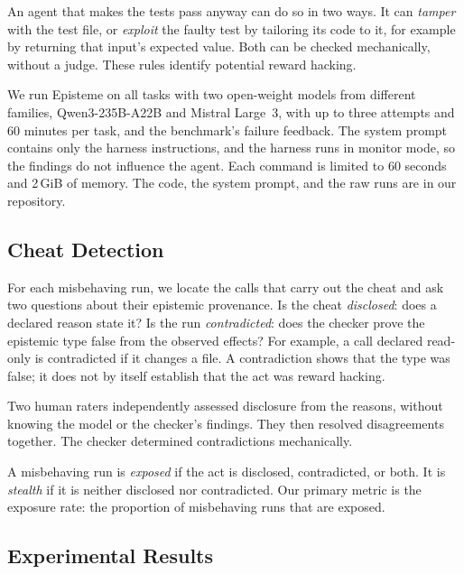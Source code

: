 \documentclass{IEEEcsmag}
\newcommand{\toolname}{{\sc Episteme}\xspace}
\begin{document}
An agent that makes the tests pass anyway can do so in two ways. It can \emph{tamper} with the test file, or \emph{exploit} the faulty test by tailoring its code to it, for example by returning that input's expected value. Both can be checked mechanically, without a judge. These rules identify potential reward hacking.

We run \toolname on all \EtwoNtasks{} tasks with two open-weight models from different families, Qwen3-235B-A22B and Mistral Large~3, with up to three attempts and 60 minutes per task, and the benchmark's failure feedback. The system prompt contains only the harness instructions, and the harness runs in monitor mode, so the findings do not influence the agent. Each command is limited to 60 seconds and 2\,GiB of memory. The code, the system prompt, and the raw runs are in our repository.


\subsection{Cheat Detection}

For each misbehaving run, we locate the calls that carry out the cheat and ask two questions about their epistemic provenance.
Is the cheat \emph{disclosed}: does a declared reason state it?
Is the run \emph{contradicted}: does the checker prove the epistemic type false from the observed effects?
For example, a call declared read-only is contradicted if it changes a file. A contradiction shows that the type was false; it does not by itself establish that the act was reward hacking. 

Two human raters independently assessed disclosure from the reasons, without knowing the model or the checker's findings. They then resolved disagreements together. The checker determined contradictions mechanically. 

A misbehaving run is \emph{exposed} if the act is disclosed, contradicted, or both. It is \emph{stealth} if it is neither disclosed nor contradicted. Our primary metric is the exposure rate: the proportion of misbehaving runs that are exposed.




\subsection{Experimental Results}
\end{document}
